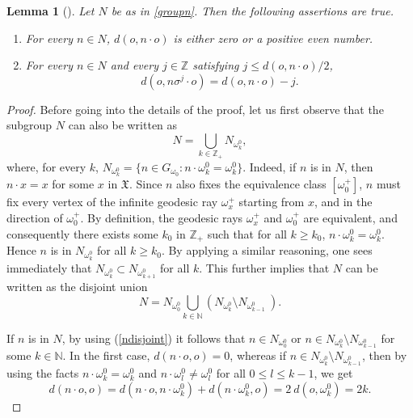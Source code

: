 \documentclass[12pt,reqno]{amsart}
\newtheorem{lemma}[theorem]{Lemma}
\theoremstyle{definition}
\theoremstyle{definition}
\numberwithin{equation}{section}
\begin{document}
\begin{lemma}[{{\cite[Lemma 2.2]{Meda_Stefano_2019}}}]\label{nproperties}
Let $N$ be as in \eqref{groupn}. Then the following assertions are true.
\begin{enumerate}
\item For every $n\in N$, $d(o,n\cdot o)$ is either zero or a positive even number.
\item For every $n\in N$ and every $j\in\mathbb{Z}$ satisfying $j\leq d(o,n\cdot o)/2$,
		$$d(o,n\sigma^{j}\cdot o)=d(o,n\cdot o)-j.$$
\end{enumerate}
\end{lemma}
\begin{proof}
Before going into the details of the proof, let us first observe that the subgroup $N$ can also be written as
$$N=\bigcup\limits_{k\in\mathbb{Z}_{+}}N_{\omega^{0}_{k}},$$
where, for every $k$, $N_{\omega^{0}_{k}}=\{n\in G_{\omega_{0}}:n\cdot\omega^{0}_{k}=\omega^{0}_{k}\}$. Indeed, if $n$ is in $N$, then $n\cdot x=x$ for some $x$ in $\mathfrak{X}$. Since $n$ also fixes the equivalence class $[\omega^{+}_{0}]$, $n$ must fix every vertex of the infinite geodesic ray $\omega^{+}_{x}$ starting from $x$, and in the direction of $\omega^{+}_{0}$. By definition, the geodesic rays $\omega^{+}_{x}$ and $\omega^{+}_{0}$ are equivalent, and consequently there exists some $k_{0}$ in $\mathbb{Z}_{+}$ such that for all $k\geq k_{0}$, $n\cdot\omega^{0}_{k}=\omega^{0}_{k}$. Hence $n$ is in $N_{\omega^{0}_{k}}$ for all $k\geq k_{0}$. By applying a similar reasoning, one sees immediately that $N_{\omega^{0}_{k}}\subset N_{\omega^{0}_{k+1}}$ for all $k$. This further implies that $N$ can be written as the disjoint union
\begin{equation}\label{ndisjoint}
N=N_{\omega^{0}_{0}}\bigcup\limits_{k\in\mathbb{N}}\left(N_{\omega^{0}_{k}}\setminus N_{\omega^{0}_{k-1}}~\right).
\end{equation}

 If $n$ is in $N$, by using (\ref{ndisjoint}) it follows that $n\in N_{\omega^{0}_{0}}$ or $n\in N_{\omega^{0}_{k}}\setminus N_{\omega^{0}_{k-1}}$ for some $k\in\mathbb{N}$. In the first case, $d(n\cdot o,o)=0$, whereas if $n\in N_{\omega^{0}_{k}}\setminus N_{\omega^{0}_{k-1}}$, then by using the facts $n\cdot \omega^{0}_{k}=\omega^{0}_{k}$ and $n\cdot \omega^{0}_{l}\neq\omega^{0}_{l}$ for all $0\leq l\leq k-1$, we get
$$d(n\cdot o,o)=d(n\cdot o,n\cdot \omega^{0}_{k})+d(n\cdot \omega^{0}_{k},o)=2~d(o,\omega^{0}_{k})=2k.$$


\end{proof}
\end{document}
